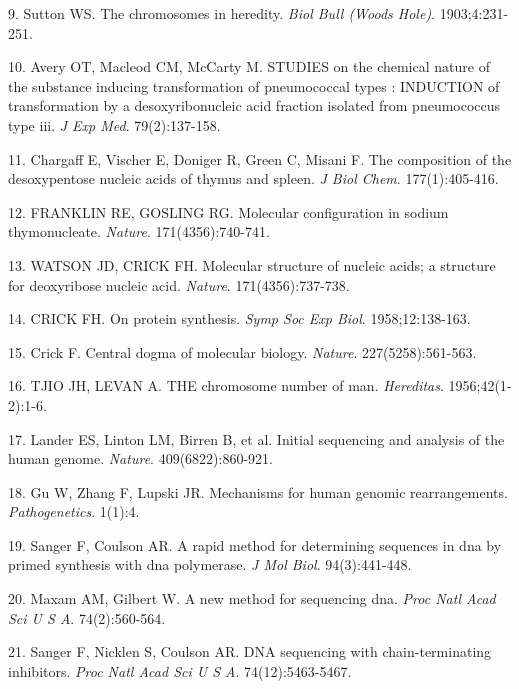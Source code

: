 \documentclass[11pt,letterpaper]{book}
\begin{document}
\leavevmode\hypertarget{ref-sutton:1903aa}{}%
9. Sutton WS. The chromosomes in heredity. \emph{Biol Bull (Woods Hole)}. 1903;4:231-251.

\leavevmode\hypertarget{ref-avery:1944aa}{}%
10. Avery OT, Macleod CM, McCarty M. STUDIES on the chemical nature of the substance inducing transformation of pneumococcal types : INDUCTION of transformation by a desoxyribonucleic acid fraction isolated from pneumococcus type iii. \emph{J Exp Med}. 79(2):137-158.

\leavevmode\hypertarget{ref-chargaff:1949aa}{}%
11. Chargaff E, Vischer E, Doniger R, Green C, Misani F. The composition of the desoxypentose nucleic acids of thymus and spleen. \emph{J Biol Chem}. 177(1):405-416.

\leavevmode\hypertarget{ref-franklin:1953aa}{}%
12. FRANKLIN RE, GOSLING RG. Molecular configuration in sodium thymonucleate. \emph{Nature}. 171(4356):740-741.

\leavevmode\hypertarget{ref-watson:1953aa}{}%
13. WATSON JD, CRICK FH. Molecular structure of nucleic acids; a structure for deoxyribose nucleic acid. \emph{Nature}. 171(4356):737-738.

\leavevmode\hypertarget{ref-crick:1958aa}{}%
14. CRICK FH. On protein synthesis. \emph{Symp Soc Exp Biol}. 1958;12:138-163.

\leavevmode\hypertarget{ref-crick:1970aa}{}%
15. Crick F. Central dogma of molecular biology. \emph{Nature}. 227(5258):561-563.

\leavevmode\hypertarget{ref-tjio:1956aa}{}%
16. TJIO JH, LEVAN A. THE chromosome number of man. \emph{Hereditas}. 1956;42(1‐2):1-6.

\leavevmode\hypertarget{ref-lander:2001aa}{}%
17. Lander ES, Linton LM, Birren B, et al. Initial sequencing and analysis of the human genome. \emph{Nature}. 409(6822):860-921.

\leavevmode\hypertarget{ref-gu:2008aa}{}%
18. Gu W, Zhang F, Lupski JR. Mechanisms for human genomic rearrangements. \emph{Pathogenetics}. 1(1):4.

\leavevmode\hypertarget{ref-sanger:1975aa}{}%
19. Sanger F, Coulson AR. A rapid method for determining sequences in dna by primed synthesis with dna polymerase. \emph{J Mol Biol}. 94(3):441-448.

\leavevmode\hypertarget{ref-maxam:1977aa}{}%
20. Maxam AM, Gilbert W. A new method for sequencing dna. \emph{Proc Natl Acad Sci U S A}. 74(2):560-564.

\leavevmode\hypertarget{ref-sanger:1977aa}{}%
21. Sanger F, Nicklen S, Coulson AR. DNA sequencing with chain-terminating inhibitors. \emph{Proc Natl Acad Sci U S A}. 74(12):5463-5467.
\end{document}

